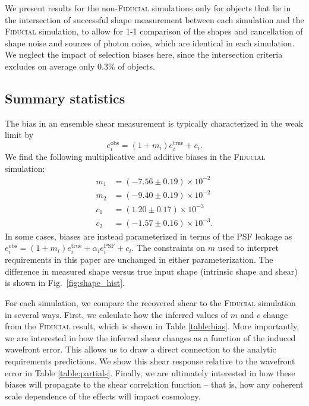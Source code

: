 \documentclass[usenatbib]{mnras}
\begin{document}
We present results for the non-\textsc{Fiducial} simulations only for objects that lie in the intersection of successful shape measurement between each simulation and the \textsc{Fiducial} simulation, to allow for 1-1 comparison of the shapes and cancellation of shape noise and sources of photon noise, which are identical in each simulation. 
We neglect the impact of selection biases here, since the intersection criteria excludes on average only 0.3\% of objects.

\subsection{Summary statistics}

The bias in an ensemble shear measurement is typically characterized in the weak limit by 
\begin{equation}
e_i^{\mathrm{obs}} = (1+m_i) e_i^{\mathrm{true}} + c_i.
\end{equation}
We find the following multiplicative and additive biases in the \textsc{Fiducial} simulation: 
\begin{align*}
m_1 &= (-7.56 \pm 0.19)\times 10^{-2}\\ 
m_2 &= (-9.40 \pm 0.19)\times 10^{-2}\\ 
c_1 &= (1.20 \pm 0.17)\times 10^{-3}\\
c_2 &= (-1.57 \pm 0.16)\times 10^{-3}.
\end{align*}
In some cases, biases are instead parameterized in terms of the PSF leakage as $e_i^{\mathrm{obs}} = (1+m_i) e_i^{\mathrm{true}} + \alpha_i e^{\mathrm{PSF}}_i + c_i$. 
The constraints on $m$ used to interpret requirements in this paper are unchanged in either parameterization. 
The difference in measured shape versus true input shape (intrinsic shape and shear) is shown in Fig.~\ref{fig:shape_hist}.

For each simulation, we compare the recovered shear to the \textsc{Fiducial} simulation in several ways. First, we calculate how the inferred values of $m$ and $c$ change from the \textsc{Fiducial} result, which is shown in Table \ref{table:bias}. More importantly, we are interested in how the inferred shear changes as a function of the induced wavefront error. This allows us to draw a direct connection to the analytic requirements predictions. We show this shear response relative to the wavefront error in Table \ref{table:partials}. Finally, we are ultimately interested in how these biases will propagate to the shear correlation function -- that is, how any coherent scale dependence of the effects will impact cosmology. 
\end{document}
